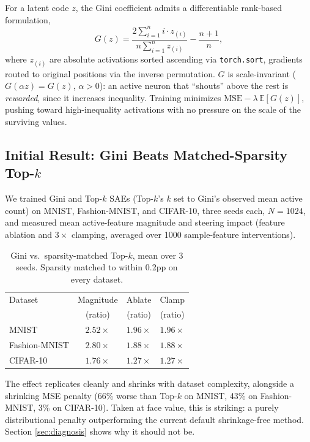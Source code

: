 \documentclass[11pt,twocolumn]{article}
\begin{document}
For a latent code $z$, the Gini coefficient admits a differentiable rank-based formulation,
\begin{equation}
G(z) = \frac{2 \sum_{i=1}^n i \cdot z_{(i)}}{n \sum_{i=1}^n z_{(i)}} - \frac{n+1}{n},
\label{eq:gini}
\end{equation}
where $z_{(i)}$ are absolute activations sorted ascending via \texttt{torch.sort}, gradients routed to original positions via the inverse permutation. $G$ is scale-invariant ($G(\alpha z){=}G(z)$, $\alpha{>}0$): an active neuron that ``shouts'' above the rest is \emph{rewarded}, since it increases inequality. Training minimizes $\mathrm{MSE} - \lambda\,\mathbb{E}[G(z)]$, pushing toward high-inequality activations with no pressure on the scale of the surviving values.

\subsection{Initial Result: Gini Beats Matched-Sparsity Top-$k$}
\label{sec:initial-result}
We trained Gini and Top-$k$ SAEs (Top-$k$'s $k$ set to Gini's observed mean active count) on MNIST, Fashion-MNIST, and CIFAR-10, three seeds each, $N{=}1024$, and measured mean active-feature magnitude and steering impact (feature ablation and $3\times$ clamping, averaged over 1000 sample-feature interventions).

\begin{table}[h]
\centering
\caption{Gini vs.\ sparsity-matched Top-$k$, mean over 3 seeds. Sparsity matched to within 0.2pp on every dataset.}
\label{tab:initial-result}
\begin{tabular}{@{}lccc@{}}
\toprule
Dataset & Magnitude & Ablate & Clamp \\
& (ratio) & (ratio) & (ratio) \\ \midrule
MNIST & $2.52\times$ & $1.96\times$ & $1.96\times$ \\
Fashion-MNIST & $2.80\times$ & $1.88\times$ & $1.88\times$ \\
CIFAR-10 & $1.76\times$ & $1.27\times$ & $1.27\times$ \\ \bottomrule
\end{tabular}
\end{table}

The effect replicates cleanly and shrinks with dataset complexity, alongside a shrinking MSE penalty (66\% worse than Top-$k$ on MNIST, 43\% on Fashion-MNIST, 3\% on CIFAR-10). Taken at face value, this is striking: a purely distributional penalty outperforming the current default shrinkage-free method. Section \ref{sec:diagnosis} shows why it should not be.
\end{document}
